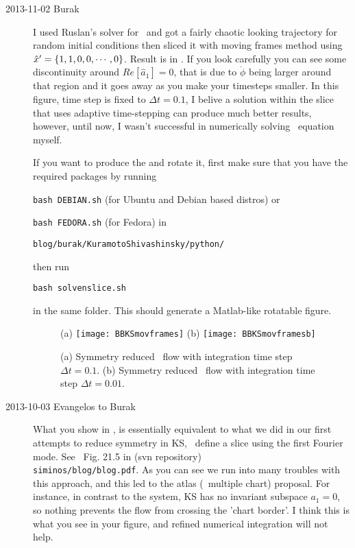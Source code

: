\begin{description}
\item[2013-11-02 Burak] I used Ruslan's solver for \KS\ and got a fairly chaotic
looking trajectory for random initial conditions then sliced it with moving
frames method using ${\hat{x}'}=\{1,1,0,0,\cdots,0\}$.
Result is in . If you look carefully you can see
some discontinuity around $Re[\hat{a}_1] = 0$, that is due to $\dot{\phi}$
being larger around that region and it goes away as you make your timesteps
smaller. In this figure, time step is fixed to $\Delta t = 0.1$, I belive
a solution within the slice that uses adaptive time-stepping can produce much
better results, however, until now, I wasn't successful in numerically solving
\KS\ equation myself.

If you want to produce the  and rotate it, first
make sure that you have the required packages by running

\texttt{bash DEBIAN.sh} (for Ubuntu and Debian based distros) or

\texttt{bash FEDORA.sh} (for Fedora) in

\texttt{blog/burak/KuramotoShivashinsky/python/}

then run

\texttt{bash solvenslice.sh}

in the same folder. This should generate a Matlab-like rotatable figure.

\begin{figure}%
\centering
 (a) \texttt{[image: BBKSmovframes]}
 (b) \texttt{[image: BBKSmovframesb]}
\caption{(a) Symmetry reduced \KS\ flow with integration time step $\Delta t = 0.1$.
(b) Symmetry reduced \KS\ flow with integration time step $\Delta t = 0.01$.
}
\label{fig:BBKSmovframes}
\end{figure}


\item[2013-10-03 Evangelos to Burak]
What you show in , is essentially
equivalent to what we did in our first attempts to reduce symmetry in KS, \ie\
define a slice using the first Fourier mode. See \eg\ Fig. 21.5 in
(svn repository)
\\
\texttt{siminos/blog/blog.pdf}. As you can see we run into
many troubles with this approach, and this led to the atlas (\ie\ multiple chart)
proposal. For instance, in contrast to the {\twoMode} system, KS has no invariant
subspace $a_1=0$, so nothing prevents the flow from crossing the 'chart border'.
I think this is what you see in your figure, and refined numerical integration
will not help.


\end{description}
